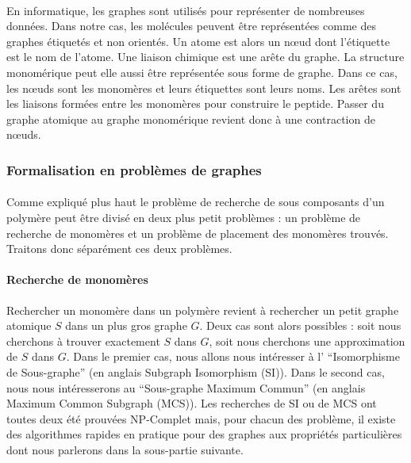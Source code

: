 \documentclass[12pt,french,twoside]{report}
\begin{document}
\paragraph{}En informatique, les graphes sont utilisés pour représenter de nombreuses données.
Dans notre cas, les molécules peuvent être représentées comme des graphes étiquetés et non orientés.
Un atome est alors un n\oe{}ud dont l'étiquette est le nom de l'atome.
Une liaison chimique est une arête du graphe.
La structure monomérique peut elle aussi être représentée sous forme de graphe.
Dans ce cas, les n\oe{}uds sont les monomères et leurs étiquettes sont leurs noms.
Les arêtes sont les liaisons formées entre les monomères pour construire le peptide.
Passer du graphe atomique au graphe monomérique revient donc à une contraction de n\oe{}uds.


\subsubsection{Formalisation en problèmes de graphes}

\paragraph{}Comme expliqué plus haut le problème de recherche de sous composants d'un polymère peut être divisé en deux
plus petit problèmes : un problème de recherche de monomères et un problème de placement des monomères trouvés. Traitons
donc séparément ces deux problèmes.

\paragraph{Recherche de monomères}Rechercher un monomère dans un polymère revient à rechercher un petit graphe atomique
$S$ dans un plus gros graphe $G$. Deux cas sont alors possibles : soit nous cherchons à trouver exactement $S$ dans
$G$, soit nous cherchons une approximation de $S$ dans $G$. Dans le premier cas, nous allons nous intéresser à l'
``Isomorphisme de Sous-graphe'' (en anglais Subgraph Isomorphism (SI)). Dans le second cas, nous nous intéresserons au
``Sous-graphe Maximum Commun'' (en anglais Maximum Common Subgraph (MCS)). Les recherches de SI ou de MCS ont toutes
deux été prouvées NP-Complet mais, pour chacun des problème, il existe des algorithmes rapides en pratique pour des graphes
aux propriétés particulières dont nous parlerons dans la sous-partie suivante.
\end{document}
